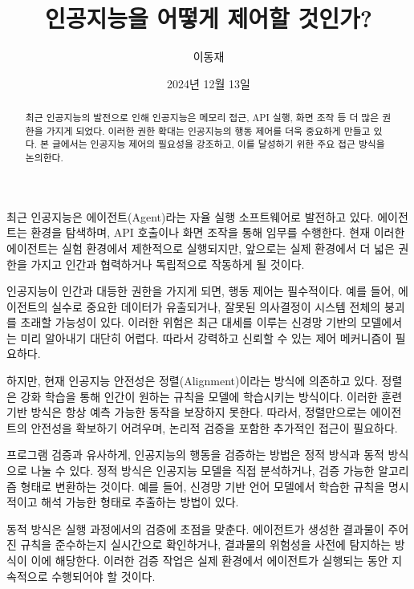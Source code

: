 \documentclass[11pt, oneside]{article}    %
\title{인공지능을 어떻게 제어할 것인가?}
\author{이동재}
\date{2024년 12월 13일}
\begin{document}
\maketitle

\begin{abstract}
    최근 인공지능의 발전으로 인해 인공지능은 메모리 접근, API 실행, 화면 조작 등 더 많은 권한을 가지게 되었다. 이러한 권한 확대는 인공지능의 행동 제어를 더욱 중요하게 만들고 있다. 본 글에서는 인공지능 제어의 필요성을 강조하고, 이를 달성하기 위한 주요 접근 방식을 논의한다.
\end{abstract}

최근 인공지능은 에이전트(Agent)라는 자율 실행 소프트웨어로 발전하고 있다. 에이전트는 환경을 탐색하며, API 호출이나 화면 조작을 통해 임무를 수행한다. 현재 이러한 에이전트는 실험 환경에서 제한적으로 실행되지만, 앞으로는 실제 환경에서 더 넓은 권한을 가지고 인간과 협력하거나 독립적으로 작동하게 될 것이다.

인공지능이 인간과 대등한 권한을 가지게 되면, 행동 제어는 필수적이다. 예를 들어, 에이전트의 실수로 중요한 데이터가 유출되거나, 잘못된 의사결정이 시스템 전체의 붕괴를 초래할 가능성이 있다. 이러한 위험은 최근 대세를 이루는 신경망 기반의 모델에서는 미리 알아내기 대단히 어렵다. 따라서 강력하고 신뢰할 수 있는 제어 메커니즘이 필요하다.

하지만, 현재 인공지능 안전성은 정렬(Alignment)이라는 방식에 의존하고 있다. 정렬은 강화 학습을 통해 인간이 원하는 규칙을 모델에 학습시키는 방식이다. 이러한 훈련 기반 방식은 항상 예측 가능한 동작을 보장하지 못한다. 따라서, 정렬만으로는 에이전트의 안전성을 확보하기 어려우며, 논리적 검증을 포함한 추가적인 접근이 필요하다.

프로그램 검증과 유사하게, 인공지능의 행동을 검증하는 방법은 정적 방식과 동적 방식으로 나눌 수 있다. 정적 방식은 인공지능 모델을 직접 분석하거나, 검증 가능한 알고리즘 형태로 변환하는 것이다. 예를 들어, 신경망 기반 언어 모델에서 학습한 규칙을 명시적이고 해석 가능한 형태로 추출하는 방법이 있다.

동적 방식은 실행 과정에서의 검증에 초점을 맞춘다. 에이전트가 생성한 결과물이 주어진 규칙을 준수하는지 실시간으로 확인하거나, 결과물의 위험성을 사전에 탐지하는 방식이 이에 해당한다. 이러한 검증 작업은 실제 환경에서 에이전트가 실행되는 동안 지속적으로 수행되어야 할 것이다.
\end{document}
